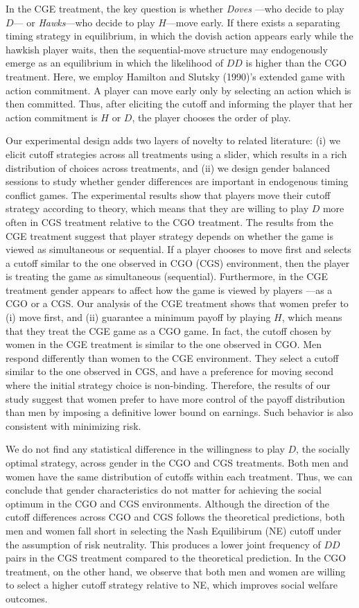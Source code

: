 \documentclass[12pt,english]{article}
\begin{document}
In the CGE treatment, the key question is whether \textit{Doves} ---who decide to play $D$--- or \textit{Hawks}---who decide to play $H$---move early. If there exists a separating timing strategy in equilibrium, in which the dovish action appears early while the hawkish player waits, then the sequential-move structure may endogenously emerge as an equilibrium in which the likelihood of $DD$ is higher than the CGO treatment. Here, we employ Hamilton and Slutsky (1990)'s extended game with action commitment. A player can move early only by selecting an action which is then committed. Thus, after eliciting the cutoff and informing the player that her action commitment is $H$ or $D$, the player chooses the order of play. 

Our experimental design adds two layers of novelty to related literature: (i) we elicit cutoff strategies across all treatments using a slider, which results in a rich distribution of choices across treatments, and (ii) we design gender balanced sessions to study whether gender differences are important in endogenous timing conflict games. The experimental results show that players move their cutoff strategy according to theory, which means that they are willing to play $D$ more often in CGS treatment relative to the CGO treatment. The results from the CGE treatment suggest that player strategy depends on whether the game is viewed as simultaneous or sequential. If a player chooses to move first and selects a cutoff similar to the one observed in CGO (CGS) environment, then the player is treating the game as simultaneous (sequential). Furthermore, in the CGE treatment gender appears to affect how the game is viewed by players ---as a CGO or a CGS. Our analysis of the CGE treatment shows that women prefer to (i) move first, and (ii) guarantee a minimum payoff by playing $H$, which means that they treat the CGE game as a CGO game. In fact, the cutoff chosen by women in the CGE treatment is similar to the one observed in CGO. Men respond differently than women to the CGE environment. They select a cutoff similar to the one observed in CGS, and have a preference for moving second where the initial strategy choice is non-binding. Therefore, the results of our study suggest that women prefer to have more control of the payoff distribution than men by imposing a definitive lower bound on earnings. Such behavior is also consistent with minimizing risk.

We do not find any statistical difference in the willingness to play $D$, the socially optimal strategy, across gender in the CGO and CGS treatments. Both men and women have the same distribution of cutoffs within each treatment. Thus, we can conclude that gender characteristics do not matter for achieving the social optimum in the CGO and CGS environments. Although the direction of the cutoff differences across CGO and CGS follows the theoretical predictions, both men and women fall short in selecting the Nash Equilibirum (NE) cutoff under the assumption of risk neutrality. This produces a lower joint frequency of $DD$ pairs in the CGS treatment compared to the theoretical prediction. In the CGO treatment, on the other hand, we observe that both men and women are willing to select a higher cutoff strategy relative to NE, which improves social welfare outcomes. 
\end{document}
